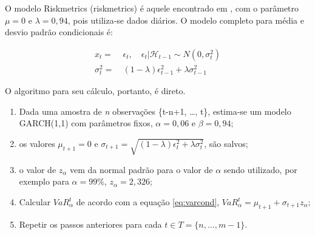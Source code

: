 \documentclass[1p]{elsarticle}
\theoremstyle{definition}
\begin{document}
O modelo Riskmetrics (riskmetrics) é aquele encontrado em \cite{RiskMetrics1995}, com o parâmetro $\mu = 0$ e $\lambda = 0,94$, pois utiliza-se dados diários. O modelo completo para média e desvio padrão condicionais é:

\begin{align}
	x_t=&\ \epsilon_t, \quad \epsilon_t|\mathcal{H}_{t-1} \sim N(0, \sigma^2_t)\\
	\sigma^2_t=&\ (1-\lambda)\epsilon^2_{t-1}+\lambda \sigma^2_{t-1}
\end{align}

O algoritmo para seu cálculo, portanto, é direto. 

\begin{enumerate}
	\item Dada uma amostra de \emph{n} observações \{t-n+1, \ldots, t\}, estima-se um modelo GARCH(1,1) com parâmetros fixos, $\alpha=0,06$ e $\beta = 0,94$;
	\item os valores $\mu_{t+1} = 0$ e $\sigma_{t+1}=\sqrt{(1-\lambda)\epsilon^2_{t}+\lambda \sigma^2_{t}}$, são salvos;
	\item o valor de $z_\alpha$ vem da normal padrão para o valor de $\alpha$ sendo utilizado, por exemplo para $\alpha = 99\%$, $z_\alpha = 2,326$;
	\item Calcular $VaR^t_\alpha$ de acordo com a equação \eqref{eq:varcond}, $VaR_\alpha^t=\mu_{t+1}+\sigma_{t+1}z_\alpha$;
	\item Repetir os passos anteriores para cada $t \in T = \{n, \ldots, m-1\}$.
\end{enumerate}
\end{document}
